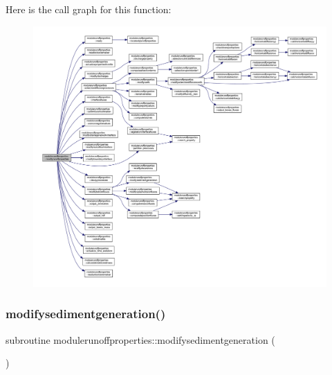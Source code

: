 Here is the call graph for this function\+:\nopagebreak
\begin{figure}[H]
\begin{center}
\leavevmode
\includegraphics[width=350pt]{namespacemodulerunoffproperties_a3d6f36b2dc50b19f17e60e0778172343_cgraph}
\end{center}
\end{figure}
\mbox{\label{namespacemodulerunoffproperties_a0edf1338341bbf4f8702def7a1f71c32}} 
\subsubsection{\texorpdfstring{modifysedimentgeneration()}{modifysedimentgeneration()}}
{\footnotesize\ttfamily subroutine modulerunoffproperties\+::modifysedimentgeneration (\begin{DoxyParamCaption}{ }\end{DoxyParamCaption})\hspace{0.3cm}{\ttfamily [private]}}

